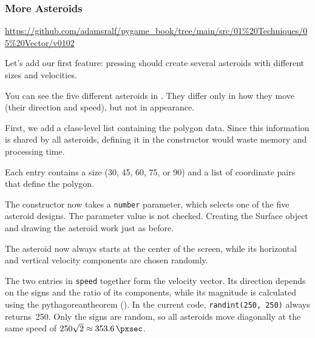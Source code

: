 

\newpage
\subsubsection*{More Asteroids}
\begin{diskbox}
	\url{https://github.com/adamsralf/pygame_book/tree/main/src/01%20Techniques/05%20Vector/v0102}
\end{diskbox}

\begin{figure}%
	\begin{center}%
		\vspace{-2em}%
	\end{center}%
\end{figure}%
Let's add our first feature: pressing  should create several asteroids with different sizes and velocities.

You can see the five different asteroids in . They differ only in how they move (their direction and speed), but not in appearance.

First, we add a class-level list containing the polygon data. Since this information is shared by all asteroids, defining it in the constructor would waste memory and processing time. 

Each entry contains a size (30, 45, 60, 75, or 90) and a list of coordinate pairs that define the polygon.

The constructor now takes a \texttt{number} parameter, which selects one of the five asteroid designs. The parameter value is not checked. Creating the Surface object and drawing the asteroid work just as before.

The asteroid now always starts at the center of the screen, while its horizontal and vertical velocity components are chosen randomly.

The two entries in \texttt{speed} together form the velocity vector. Its direction depends on the signs and the ratio of its components, while its magnitude is calculated using the \gls{pythagoreantheorem} (). In the current code, \texttt{randint(250, 250)} always returns~250. Only the signs are random, so all asteroids move diagonally at the same speed of $250\sqrt{2}\approx\SI{353.6}{\pxsec}$.

